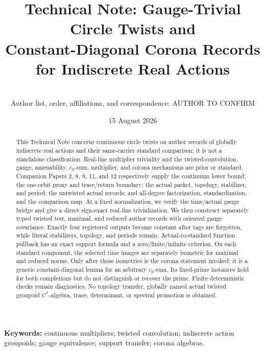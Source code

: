 \documentclass[11pt]{article}
\title{\textbf{Technical Note: Gauge-Trivial Circle Twists and\\
Constant-Diagonal Corona Records for Indiscrete Real Actions}}
\author{\AuthorConfirm\\
\small Author list, order, affiliations, and correspondence: AUTHOR TO CONFIRM}
\date{15 August 2026}
\theoremstyle{definition}
\begin{document}
\maketitle

\begin{center}
\end{center}

\begin{abstract}
This Technical Note concerns continuous circle twists on author records of
globally indiscrete real actions and their same-carrier standard comparison;
it is not a standalone classification.  Real-line multiplier triviality and
the twisted-convolution, gauge, amenability, $c_0$-sum, multiplier, and corona
mechanisms are prior or standard.  Companion Papers 2, 8, 9, 11, and 12
respectively supply the continuum lower bound; the one-orbit proxy and
trace/return boundary; the actual packet, topology, stabilizer, and period;
the untwisted actual records; and all-degree factorization, standardization,
and the comparison map.  At a fixed normalization, we verify the
time/actual gauge bridge and give a direct sign-exact real-line
trivialization.  We then construct separately typed twisted test, maximal,
and reduced author records with oriented gauge covariance.  Exactly four
registered outputs become constant after tags are forgotten, while literal
stabilizers, topology, and periods remain.  Actual-to-standard function
pullback has an exact support formula and a zero/finite/infinite criterion.
On each standard component, the selected time images are separately
isometric for maximal and reduced norms.  Only after those isometries is the
corona statement invoked: it is a generic constant-diagonal lemma for an
arbitrary $c_0$-sum.  Its fixed-prime instances hold for both completions but
do not distinguish or recover the prime.  Finite deterministic checks remain
diagnostics.  No topology transfer, globally named actual twisted groupoid
$C^*$-algebra, trace, determinant, or spectral promotion is obtained.
\end{abstract}

\noindent\textbf{Keywords:} continuous multipliers; twisted convolution;
indiscrete action groupoids; gauge equivalence; support transfer; corona
algebras.
\end{document}
